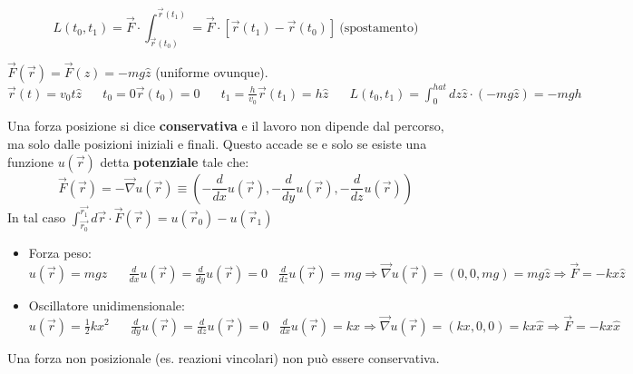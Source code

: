 $$L(t_0, t_1) = \vec{F} \cdot \int_{\vec{r}(t_0)}^{\vec{r}(t_1)} = \vec{F} \cdot [\vec{r}(t_1) - \vec{r}(t_0)] \:\text{(spostamento)}$$
\begin{example}
    $\vec{F}(\vec{r}) = \vec{F}(z) = -mg\hat{z}$ (uniforme ovunque).\\
    $\vec{r}(t) = v_0 t\hat{z} \hspace{20pt} t_0 = 0 \vec{r}(t_0) = 0 \hspace{20pt} t_1 = \frac{h}{v_0} \vec{r}(t_1) = h\hat{z} \hspace{20pt}L(t_0, t_1) = \int_{0}^{hat}dz \hat{z} \cdot (-mg\hat{z}) = -mgh$
\end{example}
\hspace{15pt}Una forza posizione si dice \textbf{conservativa} e il lavoro non dipende dal percorso, ma solo dalle posizioni iniziali e finali.
Questo accade se e solo se esiste una funzione $u(\vec{r})$ detta \textbf{potenziale} tale che:
$$\vec{F}(\vec{r}) = -\vec{\nabla}u(\vec{r}) \equiv (-\frac{d}{dx}u(\vec{r}), -\frac{d}{dy}u(\vec{r}), -\frac{d}{dz}u(\vec{r}))$$
In tal caso $\int_{\vec{r_0}}^{\vec{r_1}} d\vec{r} \cdot \vec{F}(\vec{r}) = u(\vec{r}_0) - u(\vec{r}_1)$
\begin{itemize}
    \item Forza peso: $u(\vec{r}) = mgz \hspace{20pt} \frac{d}{dx}u(\vec{r}) = \frac{d}{dy}u(\vec{r}) = 0 \hspace{10pt} \frac{d}{dz}u(\vec{r}) = mg \Rightarrow \vec{\nabla}u(\vec{r}) = (0,0, mg)= mg\hat{z} \Rightarrow \vec{F}= -kx\hat{z}$
    \item Oscillatore unidimensionale: $u(\vec{r}) = \frac{1}{2}kx^2 \hspace{20pt} \frac{d}{dy}u(\vec{r}) = \frac{d}{dz} u(\vec{r}) = 0 \hspace{10pt} \frac{d}{dx}u(\vec{r}) = kx \Rightarrow \vec{\nabla}u(\vec{r}) = (kx, 0, 0) = kx\hat{x} \Rightarrow \vec{F} = -kx\hat{x}$
\end{itemize}
\begin{observation}
    Una forza non posizionale (es. reazioni vincolari) non può essere conservativa.
\end{observation}

